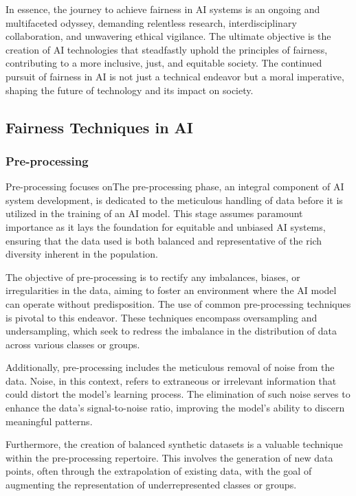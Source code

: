 \documentclass[12pt,a4paper,openright,twoside]{book}
\begin{document}
In essence, the journey to achieve fairness in AI systems is an ongoing and multifaceted odyssey, demanding relentless research, interdisciplinary collaboration, and unwavering ethical vigilance. The ultimate objective is the creation of AI technologies that steadfastly uphold the principles of fairness, contributing to a more inclusive, just, and equitable society. The continued pursuit of fairness in AI is not just a technical endeavor but a moral imperative, shaping the future of technology and its impact on society.

\subsection{Fairness Techniques in AI}

\subsubsection{Pre-processing}

Pre-processing focuses onThe pre-processing phase, an integral component of AI system development, is dedicated to the meticulous handling of data before it is utilized in the training of an AI model. This stage assumes paramount importance as it lays the foundation for equitable and unbiased AI systems, ensuring that the data used is both balanced and representative of the rich diversity inherent in the population. 

The objective of pre-processing is to rectify any imbalances, biases, or irregularities in the data, aiming to foster an environment where the AI model can operate without predisposition. The use of common pre-processing techniques is pivotal to this endeavor. These techniques encompass oversampling and undersampling, which seek to redress the imbalance in the distribution of data across various classes or groups. 

Additionally, pre-processing includes the meticulous removal of noise from the data. Noise, in this context, refers to extraneous or irrelevant information that could distort the model's learning process. The elimination of such noise serves to enhance the data's signal-to-noise ratio, improving the model's ability to discern meaningful patterns. 

Furthermore, the creation of balanced synthetic datasets is a valuable technique within the pre-processing repertoire. This involves the generation of new data points, often through the extrapolation of existing data, with the goal of augmenting the representation of underrepresented classes or groups. 
\end{document}
